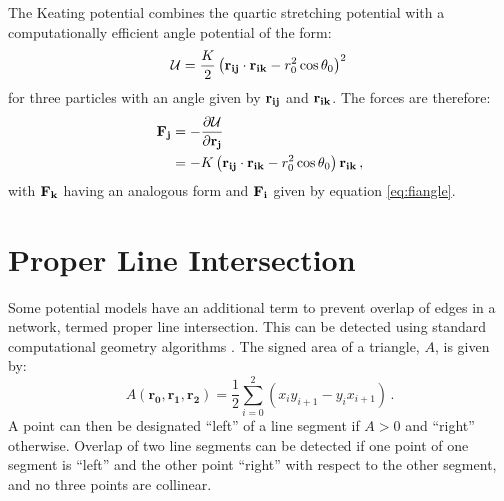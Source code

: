 The Keating potential combines the quartic stretching potential with a computationally efficient angle potential of the form:
\begin{equation}
	\mathcal{U} = \frac{K}{2}\left(\mathbf{r_{ij}}\cdot\mathbf{r_{ik}}-r_0^2\cos\theta_0\right)^2\,
\end{equation}
for three particles with an angle given by $\mathbf{r_{ij}}$ and $\mathbf{r_{ik}}$.
The forces are therefore:
\begin{align}
	\mathbf{F_j}&=-\frac{\partial \mathcal{U}}{\partial \mathbf{r_j}} \nonumber \\ 
	&=-K\left(\mathbf{r_{ij}}\cdot\mathbf{r_{ik}}-r_0^2\cos\theta_0\right)\mathbf{r_{ik}} \,,
\end{align}
with $\mathbf{F_k}$ having an analogous form and $\mathbf{F_i}$ given by equation \eqref{eq:fiangle}.

\section{Proper Line Intersection}

Some potential models have an additional term to prevent overlap of edges in a \td{} network, termed proper line intersection.
This can be detected using standard computational geometry algorithms \cite{ORourke1998}.
The signed area of a triangle, $A$, is given by:
\begin{equation}
	A\left(\mathbf{r_0}, \mathbf{r_1}, \mathbf{r_2}\right) = \frac{1}{2}\sum_{i=0}^{2} \left(x_iy_{i+1}-y_ix_{i+1}\right)\,.
\end{equation}
A point can then be designated ``left'' of a line segment if $A>0$ and ``right'' otherwise.
Overlap of two line segments can be detected if one point of one segment is ``left'' and the other point ``right'' with respect to the other segment, and no three points are collinear.
